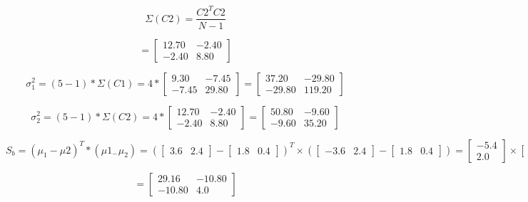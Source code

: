 \documentclass{report}
\begin{document}
\begin{flushleft}
\begin{equation}
\Sigma(C2) = \frac{C2^TC2}{N-1}  
\end{equation}

\[=\begin{bmatrix}
12.70 &	-2.40 \\
-2.40 &	8.80
\end{bmatrix}\]


\begin{equation}
\sigma_1^2 = (5-1)*\Sigma(C1) = 4 * \begin{bmatrix}
9.30 & -7.45 \\
-7.45 & 29.80
\end{bmatrix} = \begin{bmatrix}
37.20 &	-29.80 \\
-29.80 & 119.20
\end{bmatrix}
\end{equation}

\begin{equation}
\sigma_2^2 = (5-1)* \Sigma(C2) = 4 * \begin{bmatrix}
12.70 &	-2.40 \\
-2.40 &	8.80
\end{bmatrix} = \begin{bmatrix}
50.80 &	-9.60 \\
-9.60 &	35.20
\end{bmatrix}
\end{equation}

\begin{equation}
S_b = (\mu_1 - \mu2)^T*(\mu1_ - \mu_2) = (\begin{bmatrix}3.6 & 2.4 \end{bmatrix}
- \begin{bmatrix}1.8 & 0.4 \end{bmatrix})^T
\times
(\begin{bmatrix}-3.6 & 2.4 \end{bmatrix}
- \begin{bmatrix}1.8 & 0.4 \end{bmatrix})
=
\begin{bmatrix}-5.4 \\
2.0
 \end{bmatrix}
 \times
\begin{bmatrix}-5.4 & 2.0
 \end{bmatrix}  
\end{equation}

\[
=\begin{bmatrix}
 29.16 & -10.80 \\
-10.80 &	4.0
\end{bmatrix}
\]


\end{flushleft}
\end{document}
